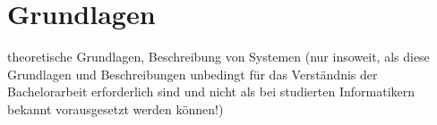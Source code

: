 \section{Grundlagen}

theoretische Grundlagen, Beschreibung von Systemen (nur insoweit, als diese Grundlagen und Beschreibungen unbedingt für das Verständnis der Bachelorarbeit erforderlich sind und nicht als bei studierten Informatikern bekannt vorausgesetzt werden können!)

\pagebreak